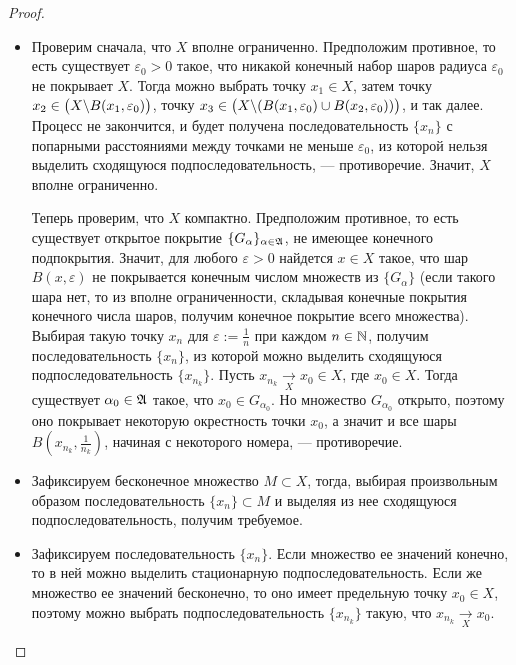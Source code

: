 \begin{proof}
\begin{itemize}
        Рассмотрим <<диагональную>> последовательность $\{x_k^k\} \subset \{x_n\}$. По построению, она является фундаментальной, и в силу полноты пространства $X$ она сходится.
        
        \item{}Проверим сначала, что $X$ вполне ограниченно. Предположим противное, то есть существует $\varepsilon_0 > 0$ такое, что никакой конечный набор шаров радиуса $\varepsilon_0$ не покрывает $X$. Тогда можно выбрать точку $x_1 \in X$, затем точку $x_2 \in \big(X \backslash B(x_1, \varepsilon_0)\big)$, точку $x_3 \in \big(X \backslash (B(x_1, \varepsilon_0) \cup B(x_2, \varepsilon_0))\big)$, и так далее. Процесс не закончится, и будет получена последовательность $\{x_n\}$ с попарными расстояниями между точками не меньше $\varepsilon_0$, из которой нельзя выделить сходящуюся подпоследовательность, --- противоречие. Значит, $X$ вполне ограниченно.
        
        Теперь проверим, что $X$ компактно. Предположим противное, то есть существует открытое покрытие $\{G_\alpha\}_{\alpha \in \mathfrak A}$, не имеющее конечного подпокрытия. Значит, для любого $\varepsilon > 0$ найдется $x \in X$ такое, что шар $B(x, \varepsilon)$ не покрывается конечным числом множеств из $\{G_\alpha\}$ (если такого шара нет, то из вполне ограниченности, складывая конечные покрытия конечного числа шаров, получим конечное покрытие всего множества). Выбирая такую точку $x_n$ для $\varepsilon := \frac 1n$ при каждом $n \in \mathbb{N}$, получим последовательность $\{x_n\}$, из которой можно выделить сходящуюся подпоследовательность $\{x_{n_k}\}$. Пусть $x_{n_k} \xrightarrow[X]{} x_0 \in X$, где $x_0 \in X$. Тогда существует $\alpha_0 \in \mathfrak A$ такое, что $x_0 \in G_{\alpha_0}$. Но множество $G_{\alpha_0}$ открыто, поэтому оно покрывает некоторую окрестность точки $x_0$, а значит и все шары $B(x_{n_k}, \frac1{n_k})$, начиная с некоторого номера, --- противоречие.
        
        \item{}Зафиксируем бесконечное множество $M \subset X$, тогда, выбирая произвольным образом последовательность $\{x_n\} \subset M$ и выделяя из нее сходящуюся подпоследовательность, получим требуемое.
        
        \item{}Зафиксируем последовательность $\{x_n\}$. Если множество ее значений конечно, то в ней можно выделить стационарную подпоследовательность. Если же множество ее значений бесконечно, то оно имеет предельную точку $x_0 \in X$, поэтому можно выбрать подпоследовательность $\{x_{n_k}\}$ такую, что $x_{n_k} \xrightarrow[X]{} x_0$.\qedhere
    \end{itemize}
\end{proof}

